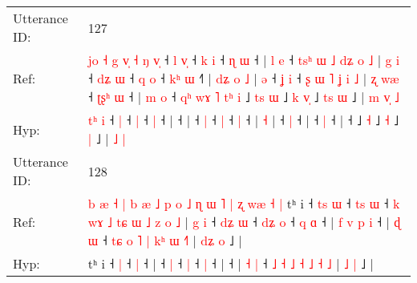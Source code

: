 \documentclass[10pt]{article}
\DeclareRobustCommand{\hl}[1]{{\textcolor{red}{#1}}}
\begin{document}
\begin{longtable}{ll}
 \\
\midrule
Utterance ID: & 127 \\
Ref: & \hl{j}\hl{o}\hl{ }\hl{˧}\hl{ }\hl{g}\hl{ }\hl{v}\hl{̩}\hl{ }\hl{˧}\hl{ }\hl{ŋ} \hl{v}\hl{̩} ˧\hl{ }\hl{l} \hl{v}\hl{̩} ˧\hl{ }\hl{k} \hl{i} ˧\hl{ }\hl{ɳ} \hl{ɯ} ˧ |\hl{ }\hl{l}\hl{ }\hl{e} ˧\hl{ }\hl{t}\hl{s}\hl{ʰ}\hl{ }\hl{ɯ}\hl{ }\hl{˩}\hl{ }\hl{d}\hl{ʑ}\hl{ }\hl{o}\hl{ }\hl{˩} |\hl{ }\hl{g}\hl{ }\hl{i} ˧\hl{ }\hl{d}\hl{ʑ} \hl{ɯ} ˧\hl{ }\hl{q} \hl{o} ˧\hl{ }\hl{k}\hl{ʰ} \hl{ɯ} ˧\hl{˥} |\hl{ }\hl{d}\hl{ʑ}\hl{ }\hl{o} \hl{˩} |\hl{ }\hl{ə} ˧\hl{ }\hl{ʝ} \hl{i} ˧\hl{ }\hl{ʂ}\hl{ }\hl{ɯ}\hl{ }\hl{˥}\hl{ }\hl{ʝ}\hl{ }\hl{i}\hl{ }\hl{˩} |\hl{ }\hl{ʐ}\hl{ }\hl{w}\hl{æ} ˧\hl{ }\hl{ʈ}\hl{ʂ}\hl{ʰ} \hl{ɯ} ˧ |\hl{ }\hl{m}\hl{ }\hl{o} ˧\hl{ }\hl{q}\hl{ʰ}\hl{ }\hl{w}\hl{ɤ}\hl{ }\hl{˥}\hl{ }\hl{t}\hl{ʰ}\hl{ }\hl{i} ˩\hl{ }\hl{t}\hl{s} \hl{ɯ} ˩\hl{ }\hl{k} \hl{v}\hl{̩} ˩\hl{ }\hl{t}\hl{s} \hl{ɯ} ˩ |\hl{ }\hl{m} \hl{v}\hl{̩} \hl{˩}
 \\
Hyp: & \hl{}\hl{}\hl{}\hl{}\hl{}\hl{}\hl{}\hl{}\hl{}\hl{}\hl{}\hl{t}\hl{ʰ} \hl{}\hl{i} ˧\hl{}\hl{} \hl{}\hl{|} ˧\hl{}\hl{} \hl{|} ˧\hl{}\hl{} \hl{|} ˧ |\hl{}\hl{}\hl{}\hl{} ˧\hl{}\hl{}\hl{}\hl{}\hl{}\hl{}\hl{}\hl{}\hl{}\hl{}\hl{}\hl{}\hl{}\hl{}\hl{} |\hl{}\hl{}\hl{}\hl{} ˧\hl{}\hl{}\hl{} \hl{|} ˧\hl{}\hl{} \hl{|} ˧\hl{}\hl{}\hl{} \hl{|} ˧\hl{} |\hl{}\hl{}\hl{}\hl{}\hl{} \hl{˧} |\hl{}\hl{} ˧\hl{}\hl{} \hl{|} ˧\hl{}\hl{}\hl{}\hl{}\hl{}\hl{}\hl{}\hl{}\hl{}\hl{}\hl{}\hl{} |\hl{}\hl{}\hl{}\hl{}\hl{} ˧\hl{}\hl{}\hl{}\hl{} \hl{|} ˧ |\hl{}\hl{}\hl{}\hl{} ˧\hl{}\hl{}\hl{}\hl{}\hl{}\hl{}\hl{}\hl{}\hl{}\hl{}\hl{}\hl{}\hl{} ˩\hl{}\hl{}\hl{} \hl{˧} ˩\hl{}\hl{} \hl{}\hl{˧} ˩\hl{}\hl{}\hl{} \hl{|} ˩ |\hl{}\hl{} \hl{}\hl{˩} \hl{|}
 \\
\midrule
Utterance ID: & 128 \\
Ref: & \hl{b}\hl{ }\hl{æ}\hl{ }\hl{˧}\hl{ }\hl{|}\hl{ }\hl{b}\hl{ }\hl{æ}\hl{ }\hl{˩}\hl{ }\hl{p}\hl{ }\hl{o}\hl{ }\hl{˩}\hl{ }\hl{ɳ}\hl{ }\hl{ɯ}\hl{ }\hl{˥}\hl{ }\hl{|}\hl{ }\hl{ʐ}\hl{ }\hl{w}\hl{æ}\hl{ }\hl{˧}\hl{ }\hl{|}\hl{ }tʰ i ˧\hl{ }\hl{t}\hl{s} \hl{ɯ} ˧\hl{ }\hl{t}\hl{s} \hl{ɯ} ˧\hl{ }\hl{k}\hl{ }\hl{w}\hl{ɤ}\hl{ }\hl{˩}\hl{ }\hl{t}\hl{ɕ}\hl{ }\hl{ɯ}\hl{ }\hl{˩}\hl{ }\hl{z}\hl{ }\hl{o}\hl{ }\hl{˩} |\hl{ }\hl{g}\hl{ }\hl{i} ˧\hl{ }\hl{d}\hl{ʑ} \hl{ɯ} ˧\hl{ }\hl{d}\hl{ʑ} \hl{o} ˧\hl{ }\hl{q} \hl{ɑ} ˧ |\hl{ }\hl{f}\hl{ }\hl{v}\hl{ }\hl{p}\hl{ }\hl{i} ˧ | \hl{ɖ} \hl{ɯ} ˧ \hl{t}\hl{ɕ} \hl{o} \hl{˥} \hl{|} \hl{k}\hl{ʰ} \hl{ɯ} \hl{˧}\hl{˥} | \hl{d}\hl{ʑ} \hl{o} ˩ |
 \\
Hyp: & \hl{}\hl{}\hl{}\hl{}\hl{}\hl{}\hl{}\hl{}\hl{}\hl{}\hl{}\hl{}\hl{}\hl{}\hl{}\hl{}\hl{}\hl{}\hl{}\hl{}\hl{}\hl{}\hl{}\hl{}\hl{}\hl{}\hl{}\hl{}\hl{}\hl{}\hl{}\hl{}\hl{}\hl{}\hl{}\hl{}\hl{}tʰ i ˧\hl{}\hl{}\hl{} \hl{|} ˧\hl{}\hl{}\hl{} \hl{|} ˧\hl{}\hl{}\hl{}\hl{}\hl{}\hl{}\hl{}\hl{}\hl{}\hl{}\hl{}\hl{}\hl{}\hl{}\hl{}\hl{}\hl{}\hl{}\hl{}\hl{} |\hl{}\hl{}\hl{}\hl{} ˧\hl{}\hl{}\hl{} \hl{|} ˧\hl{}\hl{}\hl{} \hl{|} ˧\hl{}\hl{} \hl{|} ˧ |\hl{}\hl{}\hl{}\hl{}\hl{}\hl{}\hl{}\hl{} ˧ | \hl{˧} \hl{|} ˧ \hl{}\hl{˩} \hl{˧} \hl{˩} \hl{˧} \hl{}\hl{˩} \hl{˧} \hl{}\hl{˩} | \hl{}\hl{˩} \hl{|} ˩ |

\end{longtable}
\end{document}
